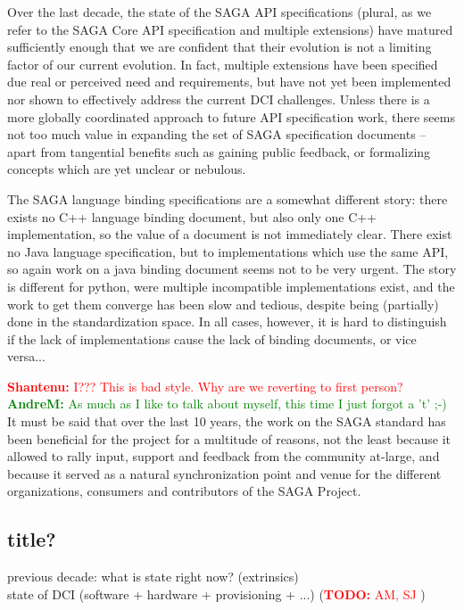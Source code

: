 \documentclass{article}
\newcommand{\B}[1]{\textbf{#1}}
\newcommand{\todo}[1]{{\textcolor{red}{\B{TODO:} #1 }}}
\newcommand{\jhanote}[1]{{\textcolor{red}{     \B{Shantenu:} #1 }}}
\newcommand{\amnote}[1]{{\textcolor{green}{   \B{AndreM:  } #1 }}}
\newcommand{\jhanote}[1]{}
\newcommand{\amnote}[1]{}
\begin{document}
  Over the last decade, the state of the SAGA API specifications
  (plural, as we refer to the SAGA Core API specification and multiple
  extensions) have matured sufficiently enough that we are confident
  that their evolution is not a limiting factor of our current
  evolution.  In fact, multiple extensions have been specified due
  real or perceived need and requirements, but have not yet been
  implemented nor shown to effectively address the current DCI
  challenges.  Unless there is a more globally coordinated approach to
  future API specification work, there seems not too much value in
  expanding the set of SAGA specification documents -- apart from
  tangential benefits such as gaining public feedback, or formalizing
  concepts which are yet unclear or nebulous.

  The SAGA language binding specifications are a somewhat different
  story: there exists no C++ language binding document, but also only
  one C++ implementation, so the value of a document is not
  immediately clear.  There exist no Java language specification, but
  to implementations which use the same API, so again work on a java
  binding document seems not to be very urgent.  The story is
  different for python, were multiple incompatible implementations
  exist, and the work to get them converge has been slow and tedious,
  despite being (partially) done in the standardization space.  In all
  cases, however, it is hard to distinguish if the lack of
  implementations cause the lack of binding documents, or vice
  versa...

  \jhanote{I??? This is bad style. Why are we reverting to first
    person?}\amnote{As much as I like to talk about myself, this time
    I just forgot a 't' ;-)}
  It must be said that over the last 10 years, the work on the SAGA
  standard has been beneficial for the project for a multitude of
  reasons, not the least because it allowed to rally input, support
  and feedback from the community at-large, and because it served as a
  natural synchronization point and venue for the different
  organizations, consumers and contributors of the SAGA Project.


\subsection{title?}
 previous decade: what is state right now? (extrinsics)\\
 
state of DCI (software + hardware + provisioning + ...) (\todo{AM, SJ})\\
 
\end{document}
